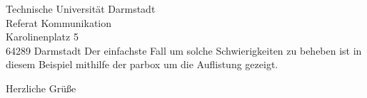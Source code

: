 \documentclass[
	ngerman,
	accentcolor=9c,%
	premium=true,%
]{tudaletter}
\begin{document}
\begin{letter}{%
    Technische Universität Darmstadt\\%
    Referat Kommunikation\\%
    Karolinenplatz 5\\%
    64289 Darmstadt}
Der einfachste Fall um solche Schwierigkeiten zu beheben ist in diesem Beispiel mithilfe der parbox um die Auflistung gezeigt.

\closing{Herzliche Grüße}


\end{letter}
\end{document}
